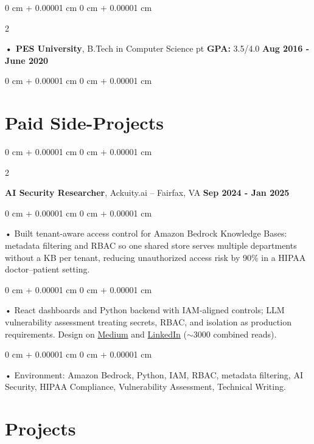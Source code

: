 \documentclass[10pt, letterpaper]{article}
\newenvironment{onecolentry}{
    \begin{adjustwidth}{
        0 cm + 0.00001 cm
    }{
        0 cm + 0.00001 cm
    }
}{
    \end{adjustwidth}
} %
\newenvironment{twocolentry}[2][]{
    \onecolentry
    \def\secondColumn{#2}
    \setcolumnwidth{\fill, 4.5 cm}
    \begin{paracol}{2}
}{
    \switchcolumn \raggedleft \secondColumn
    \end{paracol}
    \endonecolentry
} %
\begin{document}
        \begin{twocolentry}{
            \textbf{Aug 2016 - June 2020}
        }
            \textbf{ • PES University}, B.Tech in Computer Science  pt \textbf{GPA:} 3.5/4.0  \end{twocolentry}
        \begin{onecolentry}

                        \vspace{0.2cm}
    \section{Paid Side-Projects}
            \vspace{2 pt }
                    \begin{twocolentry}{
            \textbf{Sep 2024 - Jan 2025}
        }
            \textbf{AI Security Researcher}, Ackuity.ai -- Fairfax, VA\end{twocolentry}

        \begin{onecolentry}
             • Built tenant-aware access control for Amazon Bedrock Knowledge Bases: metadata filtering and RBAC so one shared store serves multiple departments without a KB per tenant, reducing unauthorized access risk by 90\% in a HIPAA doctor--patient setting.
        \end{onecolentry}
        \begin{onecolentry}
             • React dashboards and Python backend with IAM-aligned controls; LLM vulnerability assessment treating secrets, RBAC, and isolation as production requirements. Design on \href{https://medium.com/@sreenikethaathreya/building-a-permission-aware-genai-application-on-amazon-bedrock-8fdc2410dd43}{Medium} and \href{https://www.linkedin.com/pulse/building-permission-aware-genai-application-amazon-bedrock-aathreya-g7nme/}{LinkedIn} ($\sim$3000 combined reads).
        \end{onecolentry}
        \begin{onecolentry}
             • Environment: Amazon Bedrock, Python, IAM, RBAC, metadata filtering, AI Security, HIPAA Compliance, Vulnerability Assessment, Technical Writing.

        \end{onecolentry}
             \vspace{2 pt }

        \vspace{0.15cm}
\section{Projects}
    \vspace{2 pt}
\end{onecolentry}
\end{document}

